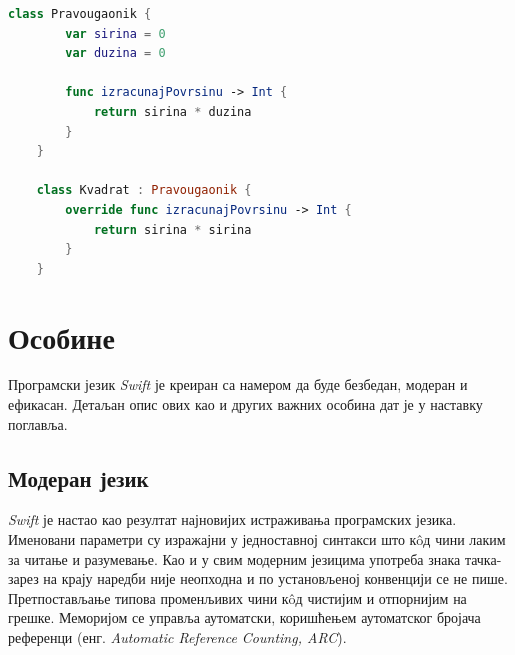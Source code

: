 \documentclass[12pt,oneside]{memoir}
\begin{document}
\begin{lstlisting}[caption=\textit{{Наслеђивање класа}}, label={lst:Наслеђивање класа}, language=Swift, frame=single]
    class Pravougaonik {
        var sirina = 0
        var duzina = 0
        
        func izracunajPovrsinu -> Int {
            return sirina * duzina
        }
    }
    
    class Kvadrat : Pravougaonik {
        override func izracunajPovrsinu -> Int {
            return sirina * sirina
        }
    }
\end{lstlisting}

\section{Особине}

\indent Програмски језик \textit{Swift} је креиран са намером да буде безбедан, модеран и ефикасан. Детаљан опис ових као и других важних особина дат је у наставку поглавља. 

\subsection{Модеран језик}
\label{sec:Модеран}

\indent \textit{Swift} је настао као резултат најновијих истраживања програмских језика.
Именовани параметри су изражајни у једноставној синтакси што к\^{o}д чини лаким за читање и разумевање. Као и у свим модерним језицима употреба знака тачка-зарез на крају наредби није неопходна и по установљеној конвенцији се не пише. Претпостављање типова променљивих чини к\^{o}д чистијим и отпорнијим на грешке. Меморијом се управља аутоматски, коришћењем аутоматског бројача референци (енг. \textit{Automatic Reference Counting, ARC}).
\end{document}
